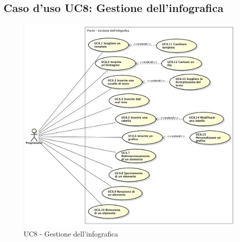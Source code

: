 \subsection{Caso d'uso UC8: Gestione dell'infografica}
\begin{figure}[h] 
	\centering 
	\includegraphics[scale=0.45] {img/UC8.png} 
	\caption{UC8 - Gestione dell'infografica} 
\end{figure}

